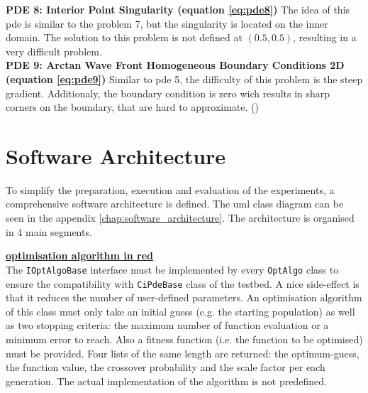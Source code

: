 \documentclass[./\jobname.tex]{subfiles}
\begin{document}
\textbf{PDE 8: Interior Point Singularity (equation \ref{eq:pde8})} The idea of this \gls{pde} is similar to the problem 7, but the singularity is located on the inner domain. The solution to this problem is not defined at $(0.5, 0.5)$, resulting in a very difficult problem. \\

\textbf{PDE 9: Arctan Wave Front Homogeneous Boundary Conditions 2D (equation \ref{eq:pde9})} Similar to \gls{pde} 5, the difficulty of this problem is the steep gradient. Additionaly, the boundary condition is zero wich results in sharp corners on the boundary, that are hard to approximate. (\cite{mitchell_nist_2018})\\


\section{Software Architecture}



To simplify the preparation, execution and evaluation of the experiments, a comprehensive software architecture is defined. The \gls{uml} class diagram can be seen in the appendix \ref{chap:software_architecture}. The architecture is organised in 4 main segments. 

\textcolor{opt_algo_colour}{\large \underline{\textbf{optimisation algorithm in red}}} \\
The \colorbox{light-gray}{\lstinline[basicstyle=\ttfamily\color{black}]|IOptAlgoBase|} interface must be implemented by every \colorbox{light-gray}{\lstinline[basicstyle=\ttfamily\color{black}]|OptAlgo|} class to ensure the compatibility with \colorbox{light-gray}{\lstinline[basicstyle=\ttfamily\color{black}]|CiPdeBase|} class of the testbed. A nice side-effect is that it reduces the number of user-defined parameters. An optimisation algorithm of this class must only take an initial guess (e.g. the starting population) as well as two stopping criteria: the maximum number of function evaluation or a minimum error to reach. Also a fitness function (i.e. the function to be optimised) must be provided. Four lists of the same length are returned: the optimum-guess, the function value, the crossover probability and the scale factor per each generation. The actual implementation of the algorithm is not predefined. 
\end{document}
